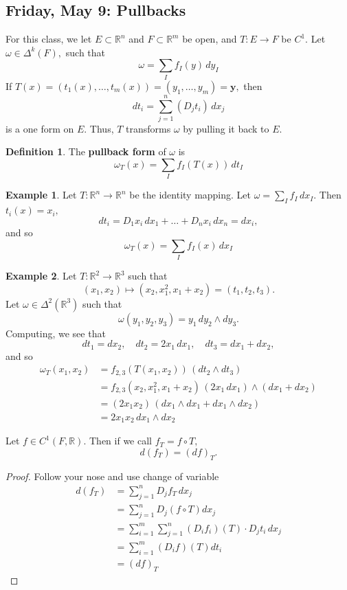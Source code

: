 \documentclass[10pt, oneside]{article}
\newcommand{\bbR}{\mathbb{R}}
\theoremstyle{definition}
\newtheorem{exmp}{Example}[section]
\newtheorem{defn}{Definition}
\begin{document}
\subsection{Friday, May 9:  Pullbacks}
For this class, we let $E\subset \bbR^n$ and $F\subset\bbR^m$ be open, and $T: E\to F$ be $C^1.$ Let $\omega \in \Delta^k(F),$ such that 
\[\omega = \sum_{I}f_I(y) \,dy_I\] If $T(x) = (t_1(x), \dots, t_m(x)) = (y_1, \dots, y_m) = \textbf{y},$ then 
\[dt_i = \sum_{j=1}^n(D_j t_i)\, dx_j\] is a one form on $E.$ Thus, $T$ transforms $\omega$ by pulling it back to $E.$ 
\begin{defn}
    The \textbf{pullback form} of $\omega$ is 
    \[\omega_T(x) = \sum_{I}f_I(T(x))\,dt_{I}\]
\end{defn}
\begin{exmp}
    Let $T: \bbR^n \to \bbR^n$ be the identity mapping. Let $\omega = \sum_I f_I \,dx_I$. Then $t_i(x) = x_i,$ 
    \[dt_i = D_1 x_i \,dx_1 + \dots + D_n x_i \, dx_n =   dx_i,\] and so 
    \[\omega_T(x) = \sum_I f_I(x)\, dx_I\]
\end{exmp}
\begin{exmp}
    Let $T: \bbR^2 \to \bbR^3$ such that 
    \[(x_1, x_2)\mapsto (x_2, x_1^2, x_1 + x_2) = (t_1, t_2, t_3).\] Let $\omega \in \Delta^2(\bbR^3)$ such that 
    \[\omega(y_1, y_2, y_3) = y_1\,dy_2 \wedge dy_3.\] Computing, we see that 
    \[dt_1 = dx_2, \quad dt_2 = 2x_1\,dx_1, \quad dt_3 = dx_1 + dx_2,\] and so 
    \begin{align*}
        \omega_T(x_1, x_2) &= f_{2,3}(T(x_1, x_2)) \,(dt_2 \wedge dt_3)\\
        &= f_{2,3}(x_2, x_1^2, x_1 + x_2) \,(2x_1\,dx_1) \wedge (dx_1 + dx_2)\\
        &= (2x_1x_2)\,(dx_1 \wedge dx_1 + dx_1 \wedge dx_2)\\
        &= 2x_1x_2\, dx_1 \wedge dx_2
    \end{align*}
\end{exmp}
\begin{lemma}
    Let $f\in C^1(F, \bbR).$ Then if we call $f_T = f\circ T,$ 
    \[d(f_T) = (df)_T.\]
\end{lemma}
\begin{proof}
    Follow your nose and use change of variable
    \begin{align*}
        d(f_T) &= \sum_{j=1}^n D_j f_T\,dx_j\\
        &= \sum_{j=1}^n D_j (f\circ T)dx_j\\
        &= \sum_{i=1}^m \sum_{j=1}^n (D_if_i)(T)\cdot D_jt_i\,dx_j\\
        &= \sum_{i=1}^m (D_if)(T)dt_i\\
        &= (df)_T
    \end{align*}
\end{proof}
\end{document}
